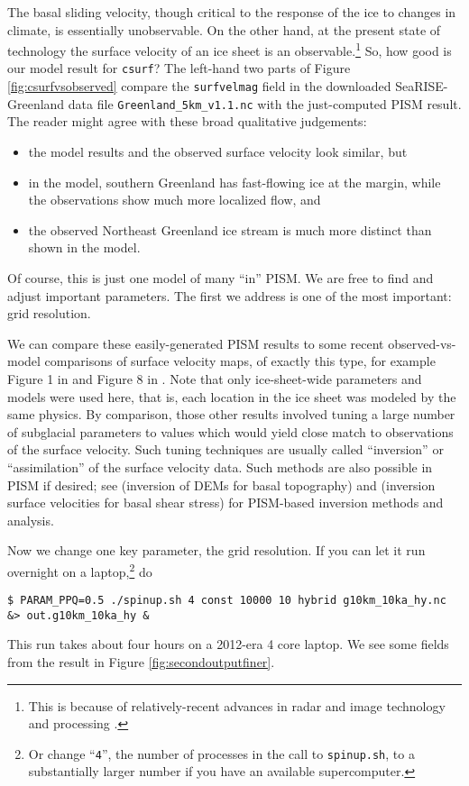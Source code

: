 The basal sliding velocity, though critical to the response of the ice to changes in climate, is essentially unobservable.  On the other hand, at the present state of technology the surface velocity of an ice sheet is an observable.\footnote{This is because of relatively-recent advances in radar and image technology and processing \cite{Joughin2002}.}  So, how good is our model result for \texttt{csurf}?  The left-hand two parts of Figure \ref{fig:csurfvsobserved} compare the \texttt{surfvelmag} field in the downloaded SeaRISE-Greenland data file \texttt{Greenland_5km_v1.1.nc} with the just-computed PISM result.  The reader might agree with these broad qualitative judgements:
\begin{itemize}
\item the model results and the observed surface velocity look similar, but
\item in the model, southern Greenland has fast-flowing ice at the margin, while the observations show much more localized flow, and
\item the observed Northeast Greenland ice stream is much more distinct than shown in the model.
\end{itemize}
Of course, this is just one model of many ``in'' PISM.  We are free to find and adjust important parameters.  The first we address is one of the most important: grid resolution.

We can compare these easily-generated PISM results to some recent observed-vs-model comparisons of surface velocity maps, of exactly this type, for example Figure 1 in \cite{Priceetal2011} and Figure 8 in \cite{Larouretal2012}.  Note that only ice-sheet-wide parameters and models were used here, that is, each location in the ice sheet was modeled by the same physics.  By comparison, those other results involved tuning a large number of subglacial parameters to values which would yield close match to observations of the surface velocity.  Such tuning techniques are usually called ``inversion'' or ``assimilation'' of the surface velocity data.  Such methods are also possible in PISM if desired; see \cite{vanPeltetal2013} (inversion of DEMs for basal topography) and \cite{Habermannetal2013} (inversion surface velocities for basal shear stress) for PISM-based inversion methods and analysis.

Now we change one key parameter, the grid resolution.  If you can let it run overnight on a laptop,\footnote{Or change ``\texttt{4}'', the number of processes in the call to \texttt{spinup.sh}, to a substantially larger number if you have an available supercomputer.} do
\begin{verbatim}
$ PARAM_PPQ=0.5 ./spinup.sh 4 const 10000 10 hybrid g10km_10ka_hy.nc &> out.g10km_10ka_hy &
\end{verbatim}
This run takes about four hours on a 2012-era 4 core laptop.  We see some fields from the result in Figure \ref{fig:secondoutputfiner}.

